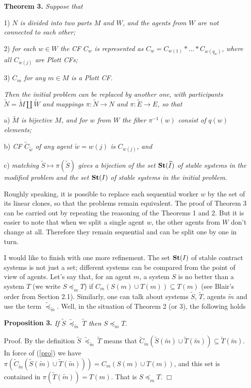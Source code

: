 \documentclass[12pt,a4paper]{article}
\begin{document}
\textbf{Theorem 3.} \emph{Suppose that}

1) \emph{$N$ is divided into two parts $M$ and $W$, and the agents from $W$ are not connected to each other;}

2) \emph{for each $w\in W$ the CF $C_w$ is represented as $C_w=C_{w(1)}*...* C_{w(q_w)}$, where all $C_{w(j)}$ are Plott CFs;}

3) \emph{$C_m$ for any $m\in M$ is a Plott CF.}

\emph{Then the initial problem can be replaced by another one, with participants $\widetilde N=\widetilde M\coprod\widetilde W$ and  mappings $\pi : \widetilde N\to N$ and $\pi: \widetilde{E} \to E$, so that}

a) \emph{$\widetilde M$ is bijective $M$, and for $w$ from $W$ the fiber $\pi      ^{-1}(w)$ consist of $q(w)$ elements;}

b) \emph{CF $\widetilde C_{\widetilde w}$ of any agent $\widetilde w=w(j)$ is  $C_{w(j)}$, and}

c) \emph{matching $\widetilde S\mapsto \pi (\widetilde S)$ gives a bijection of the set ${\bf St}(\widetilde I)$ of stable systems in the modified problem and the set ${\bf St}(I)$ of stable systems in the initial problem.}\medskip

Roughly speaking, it is possible to replace each sequential worker $w$ by the set of its linear clones, so that the problems remain equivalent. The proof of  Theorem 3 can be carried out by repeating the reasoning of the Theorems 1 and 2. But it is easier to note that when we split a single agent $w$, the other agents from $W$ don't change at all. Therefore they remain sequential and can be split one by one in turn.\medskip

I would like to finish with one more refinement. The set ${\bf St}(I)$ of stable contract systems is not just a set; different systems can be compared from the point of view of agents. Let's say that, for an agent $m$, a system $S$ is no better than a system $T$ (we write $S\preceq_m T$) if $C_m(S(m)\cup T(m)) \subseteq T(m)$ (see Blair's order from Section 2.1). Similarly, one can talk about systems $\widetilde S$, $\widetilde T$, agents $\widetilde m$ and use the term $\widetilde\preceq_{\widetilde m}$. Well, in the situation of Theorem 2 (or 3), the following holds\medskip

\textbf{Proposition 3.} \emph{If $\widetilde S\ \widetilde \preceq _{\widetilde m}\ \widetilde T$ then $S\preceq _m T$.}\medskip

Proof. By the definition $\widetilde S \ \widetilde \preceq _{\widetilde m} \ \widetilde T$ means that $\widetilde C_{\widetilde m} (\widetilde S(\widetilde m)\cup \widetilde T(\widetilde m))\subseteq \widetilde T(\widetilde m)$. In  force of (\ref{pro}) we have $\pi (\widetilde C_{\widetilde m} (\widetilde S(\widetilde m)\cup \widetilde T(\widetilde m)))=C_m(S(m)\cup T(m))$, and this set is contained in $\pi (\widetilde T(\widetilde m))=T(m)$. That is $S\preceq _m T$.  $\Box$\medskip
\end{document}
